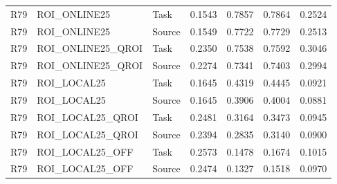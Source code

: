 \begin{longtable}{lp{.29\linewidth}lrrrr}
R79 & ROI\_ONLINE25 & Task & 0.1543 & 0.7857 & 0.7864 & 0.2524 \\
R79 & ROI\_ONLINE25 & Source & 0.1549 & 0.7722 & 0.7729 & 0.2513 \\
R79 & ROI\_ONLINE25\_QROI & Task & 0.2350 & 0.7538 & 0.7592 & 0.3046 \\
R79 & ROI\_ONLINE25\_QROI & Source & 0.2274 & 0.7341 & 0.7403 & 0.2994 \\
R79 & ROI\_LOCAL25 & Task & 0.1645 & 0.4319 & 0.4445 & 0.0921 \\
R79 & ROI\_LOCAL25 & Source & 0.1645 & 0.3906 & 0.4004 & 0.0881 \\
R79 & ROI\_LOCAL25\_QROI & Task & 0.2481 & 0.3164 & 0.3473 & 0.0945 \\
R79 & ROI\_LOCAL25\_QROI & Source & 0.2394 & 0.2835 & 0.3140 & 0.0900 \\
R79 & ROI\_LOCAL25\_OFF & Task & 0.2573 & 0.1478 & 0.1674 & 0.1015 \\
R79 & ROI\_LOCAL25\_OFF & Source & 0.2474 & 0.1327 & 0.1518 & 0.0970 \\
\hline\end{longtable}
\endgroup

